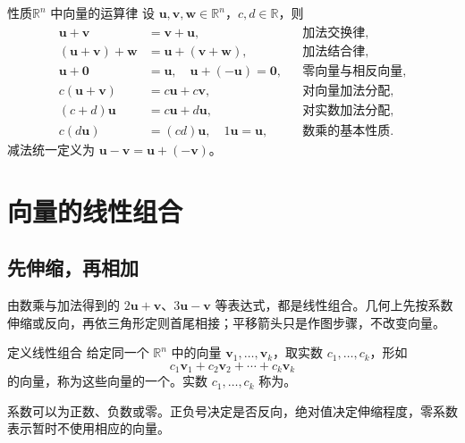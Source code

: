 \documentclass[a4paper,12pt,twoside,openany,fontset=none]{ctexbook}
\newenvironment{property}[1][]{\begin{thmBox}{性质}{#1}}{\end{thmBox}}
\newcounter{definition}[chapter]
\newenvironment{definition}[1][]{\begin{defBox}{定义}{#1}}{\end{defBox}}
\numberwithin{equation}{chapter}
\begin{document}
\begin{property}[$\mathbb{R}^n$ 中向量的运算律]
设 $\boldsymbol{u},\boldsymbol{v},\boldsymbol{w}\in\mathbb{R}^n$，$c,d\in\mathbb{R}$，则
\[
\begin{aligned}
\boldsymbol{u}+\boldsymbol{v}&=\boldsymbol{v}+\boldsymbol{u},
    &&\text{加法交换律},\\
(\boldsymbol{u}+\boldsymbol{v})+\boldsymbol{w}
    &=\boldsymbol{u}+(\boldsymbol{v}+\boldsymbol{w}),
    &&\text{加法结合律},\\
\boldsymbol{u}+\boldsymbol{0}&=\boldsymbol{u},\quad
\boldsymbol{u}+(-\boldsymbol{u})=\boldsymbol{0},
    &&\text{零向量与相反向量},\\
c(\boldsymbol{u}+\boldsymbol{v})&=c\boldsymbol{u}+c\boldsymbol{v},
    &&\text{对向量加法分配},\\
(c+d)\boldsymbol{u}&=c\boldsymbol{u}+d\boldsymbol{u},
    &&\text{对实数加法分配},\\
c(d\boldsymbol{u})&=(cd)\boldsymbol{u},\quad
1\boldsymbol{u}=\boldsymbol{u},
    &&\text{数乘的基本性质}.
\end{aligned}
\]
减法统一定义为 $\boldsymbol{u}-\boldsymbol{v}=\boldsymbol{u}+(-\boldsymbol{v})$。
\end{property}

\section{向量的线性组合}
\label{sec:zero-span}

\subsection*{先伸缩，再相加}

由数乘与加法得到的 $2\boldsymbol{u}+\boldsymbol{v}$、$3\boldsymbol{u}-\boldsymbol{v}$ 等表达式，都是线性组合。几何上先按系数伸缩或反向，再依三角形定则首尾相接；平移箭头只是作图步骤，不改变向量。

\begin{definition}[线性组合]
给定同一个 $\mathbb{R}^n$ 中的向量 $\boldsymbol{v}_1,\ldots,\boldsymbol{v}_k$，取实数 $c_1,\ldots,c_k$，形如
\[
    c_1\boldsymbol{v}_1+c_2\boldsymbol{v}_2+\cdots+c_k\boldsymbol{v}_k
\]
的向量，称为这些向量的一个\textbf{}。实数 $c_1,\ldots,c_k$ 称为。
\end{definition}

系数可以为正数、负数或零。正负号决定是否反向，绝对值决定伸缩程度，零系数表示暂时不使用相应的向量。
\end{document}
